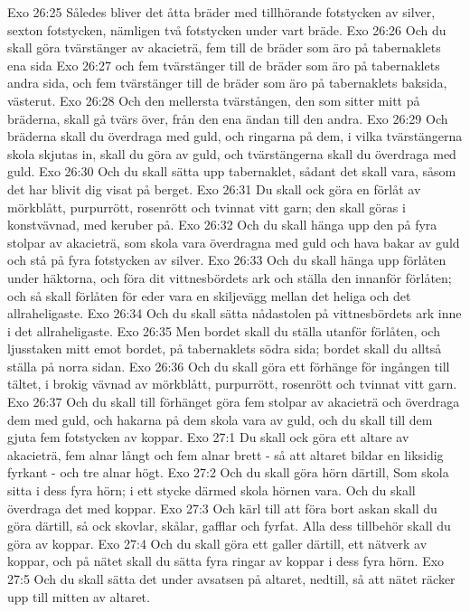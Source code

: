 Exo 26:25  Således bliver det åtta bräder med tillhörande fotstycken av silver, sexton fotstycken, nämligen två fotstycken under vart bräde.
Exo 26:26  Och du skall göra tvärstänger av akacieträ, fem till de bräder som äro på tabernaklets ena sida
Exo 26:27  och fem tvärstänger till de bräder som äro på tabernaklets andra sida, och fem tvärstänger till de bräder som äro på tabernaklets baksida, västerut.
Exo 26:28  Och den mellersta tvärstången, den som sitter mitt på bräderna, skall gå tvärs över, från den ena ändan till den andra.
Exo 26:29  Och bräderna skall du överdraga med guld, och ringarna på dem, i vilka tvärstängerna skola skjutas in, skall du göra av guld, och tvärstängerna skall du överdraga med guld.
Exo 26:30  Och du skall sätta upp tabernaklet, sådant det skall vara, såsom det har blivit dig visat på berget.
Exo 26:31  Du skall ock göra en förlåt av mörkblått, purpurrött, rosenrött och tvinnat vitt garn; den skall göras i konstvävnad, med keruber på.
Exo 26:32  Och du skall hänga upp den på fyra stolpar av akacieträ, som skola vara överdragna med guld och hava bakar av guld och stå på fyra fotstycken av silver.
Exo 26:33  Och du skall hänga upp förlåten under häktorna, och föra dit vittnesbördets ark och ställa den innanför förlåten; och så skall förlåten för eder vara en skiljevägg mellan det heliga och det allraheligaste.
Exo 26:34  Och du skall sätta nådastolen på vittnesbördets ark inne i det allraheligaste.
Exo 26:35  Men bordet skall du ställa utanför förlåten, och ljusstaken mitt emot bordet, på tabernaklets södra sida; bordet skall du alltså ställa på norra sidan.
Exo 26:36  Och du skall göra ett förhänge för ingången till tältet, i brokig vävnad av mörkblått, purpurrött, rosenrött och tvinnat vitt garn.
Exo 26:37  Och du skall till förhänget göra fem stolpar av akacieträ och överdraga dem med guld, och hakarna på dem skola vara av guld, och du skall till dem gjuta fem fotstycken av koppar.
Exo 27:1  Du skall ock göra ett altare av akacieträ, fem alnar långt och fem alnar brett - så att altaret bildar en liksidig fyrkant - och tre alnar högt.
Exo 27:2  Och du skall göra hörn därtill, Som skola sitta i dess fyra hörn; i ett stycke därmed skola hörnen vara. Och du skall överdraga det med koppar.
Exo 27:3  Och kärl till att föra bort askan skall du göra därtill, så ock skovlar, skålar, gafflar och fyrfat. Alla dess tillbehör skall du göra av koppar.
Exo 27:4  Och du skall göra ett galler därtill, ett nätverk av koppar, och på nätet skall du sätta fyra ringar av koppar i dess fyra hörn.
Exo 27:5  Och du skall sätta det under avsatsen på altaret, nedtill, så att nätet räcker upp till mitten av altaret.
